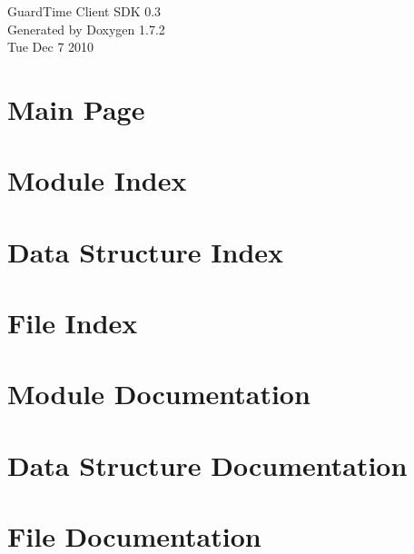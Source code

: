 \documentclass[a4paper]{book}
\begin{document}
\begin{titlepage}
\vspace*{7cm}
\begin{center}
{\Large GuardTime Client SDK 0.3}\\
\vspace*{1cm}
{\large Generated by Doxygen 1.7.2}\\
\vspace*{0.5cm}
{\small Tue Dec 7 2010}\\
\end{center}
\end{titlepage}
\clearemptydoublepage
{}
\tableofcontents
\clearemptydoublepage
{}
\chapter{Main Page}
\label{index}\hypertarget{index}{}
\chapter{Module Index}

\chapter{Data Structure Index}

\chapter{File Index}

\chapter{Module Documentation}






\chapter{Data Structure Documentation}







\chapter{File Documentation}



\printindex
\end{document}
